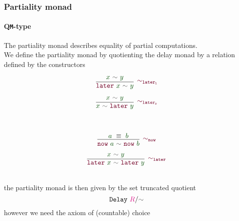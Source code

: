 \documentclass[xelatex,mathserif,serif,notheorems]{beamer} %
\theoremstyle{plain} %
\theoremstyle{definition}
\theoremstyle{remark}
\newcommand*{\term}[1]{\textcolor{green!30!black}{#1}} %
\newcommand*{\type}[1]{\textcolor{magenta!90!black}{#1}}
\newcommand*{\relation}[1]{\textcolor{gray!75!black}{\ensuremath{\mathtt{#1}}}}
\newcommand*{\constructor}[1]{\textcolor{purple!60!black}{\ensuremath{\mathtt{#1}}}}
\newcommand*{\typeformer}[1]{\ensuremath{\mathtt{#1}}}
\begin{document}
\begin{frame}
  \frametitle{Partiality monad}
  \framesubtitle{Q\texttt{M}-type}
  The partiality monad describes equality of partial computations.
  \pause
  \\[3mm]
  We define the partiality monad by quotienting the delay monad by a relation defined by the constructors
  \\
  \strut
  \hfill
  \begin{minipage}{0.4\linewidth}
    \begin{equation}
      \vcenter{\infer[{\constructor{\sim_{later_l}}}]{\constructor{later}~\term{x}~\relation{\sim}~\term{y}}{\term{x}~\relation{\sim}~\term{y}}}
    \end{equation}
  \end{minipage}
  \hfill
    \begin{minipage}{0.4\linewidth}
    \begin{equation}
      \vcenter{\infer[{\constructor{\sim_{later_r}}}]{\term{x}~\relation{\sim}~\constructor{later}~\term{y}}{\term{x}~\relation{\sim}~\term{y}}}
    \end{equation}
  \end{minipage}
  \hfill
  \strut
  \\
  \strut
  \hfill
  \begin{minipage}{0.4\linewidth}
    \begin{equation}
      \vcenter{\infer[{\constructor{\sim_{now}}}]{\constructor{now}~\term{a}~\relation{\sim}~\constructor{now}~\term{b}}{\term{a}~\equiv~\term{b}}}
    \end{equation}
  \end{minipage}
  \hfill
  \begin{minipage}{0.5\linewidth}
    \begin{equation}
      \vcenter{\infer[{\constructor{\sim_{later}}}]{\constructor{later}~\term{x}~\relation{\sim}~\constructor{later}~\term{y}}{\term{x}~\relation{\sim}~\term{y}}}
    \end{equation}
  \end{minipage}
  \hfill
  \strut
  \\[5mm]
  the partiality monad is then given by the set truncated quotient
  \begin{equation}
    \typeformer{Delay}~\type{R}/\relation{\sim}
  \end{equation}
  however we need the axiom of (countable) choice
\end{frame}
\end{document}
